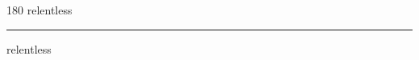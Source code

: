 
\begin{frame}
\begin{center}
\begin{turn}{180}
{\fontsize{2.5cm}{1em}\selectfont relentless}
\end{turn}
\vspace{1em}\par  
\hrule
\vspace{1em}\par  
{\fontsize{2.5cm}{1em}\selectfont relentless}
\end{center}
\end{frame}
